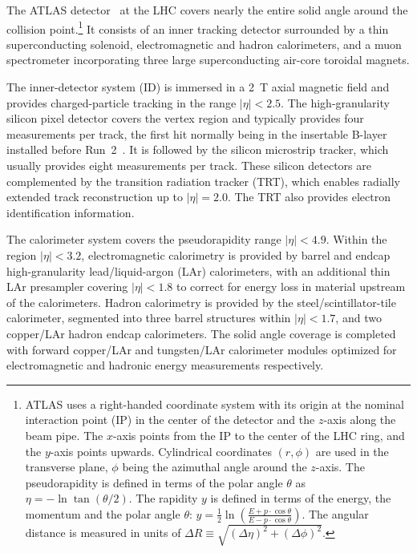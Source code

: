 \documentclass[PAPER, cernpreprint, texlive=2016, paper=a4, USenglish, texmf]{atlasdoc}
\begin{document}
\newcommand{\AtlasCoordFootnote}{
ATLAS uses a right-handed coordinate system with its origin at the nominal interaction point (IP)
in the center of the detector and the \(z\)-axis along the beam pipe.
The \(x\)-axis points from the IP to the center of the LHC ring,
and the \(y\)-axis points upwards.
Cylindrical coordinates \((r,\phi)\) are used in the transverse plane,
\(\phi\) being the azimuthal angle around the \(z\)-axis.
The pseudorapidity is defined in terms of the polar angle \(\theta\) as \(\eta = -\ln \tan(\theta/2)\).
The rapidity $y$ is defined in terms of the energy, the momentum and the polar angle \(\theta\):
$y=\frac{1}{2} \ln  \left( \frac{E+p \cdot \cos \theta}{E-p \cdot \cos \theta} \right)$.
The angular distance is measured in units of \(\Delta R \equiv \sqrt{(\Delta\eta)^{2} + (\Delta\phi)^{2}}\).}
 
The ATLAS detector~\cite{PERF-2007-01} at the LHC covers nearly the entire solid angle around the collision point.\footnote{\AtlasCoordFootnote}
It consists of an inner tracking detector surrounded by a thin superconducting solenoid, electromagnetic and hadron calorimeters,
and a muon spectrometer incorporating three large superconducting air-core toroidal magnets.
 
The inner-detector system (ID) is immersed in a \SI{2}{\tesla} axial magnetic field
and provides charged-particle tracking in the range \(|\eta| < 2.5\).
The high-granularity silicon pixel detector covers the vertex region and typically provides four measurements per track,
the first hit normally being in the insertable B-layer installed before Run~2~\cite{ATLAS-TDR-19,PIX-2018-001}.
It is followed by the silicon microstrip tracker, which usually provides eight measurements per track.
These silicon detectors are complemented by the transition radiation tracker (TRT),
which enables radially extended track reconstruction up to \(|\eta| = 2.0\).
The TRT also provides electron identification information.
 
The calorimeter system covers the pseudorapidity range \(|\eta| < 4.9\).
Within the region \(|\eta|< 3.2\), electromagnetic calorimetry is provided by barrel and
endcap high-granularity lead/liquid-argon (LAr) calorimeters,
with an additional thin LAr presampler covering \(|\eta| < 1.8\)
to correct for energy loss in material upstream of the calorimeters.
Hadron calorimetry is provided by the steel/scintillator-tile calorimeter,
segmented into three barrel structures within \(|\eta| < 1.7\), and two copper/LAr hadron endcap calorimeters.
The solid angle coverage is completed with forward copper/LAr and tungsten/LAr calorimeter modules
optimized for electromagnetic and hadronic energy measurements respectively.
 
\end{document}

